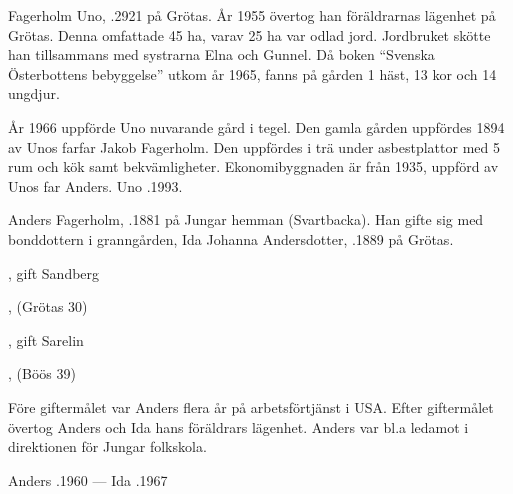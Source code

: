


Fagerholm Uno, .2921 på Grötas. År 1955 övertog han föräldrarnas lägenhet på Grötas. Denna omfattade 45 ha, varav 25 ha var odlad jord. Jordbruket skötte han tillsammans med systrarna Elna och Gunnel. Då boken ``Svenska Österbottens bebyggelse'' utkom år 1965, fanns på gården 1 häst, 13 kor och 14 ungdjur.

År 1966 uppförde Uno nuvarande gård i tegel. Den gamla gården uppfördes 1894 av Unos farfar Jakob Fagerholm. Den uppfördes i trä under asbestplattor med 5 rum och kök samt bekvämligheter. Ekonomibyggnaden är från 1935, uppförd av Unos far Anders.
Uno .1993.


Anders Fagerholm, .1881 på Jungar hemman (Svartbacka). Han gifte sig med bonddottern i granngården, Ida Johanna Andersdotter, .1889 på Grötas.
\begin{jhchildren}
  \item {}, gift Sandberg
  \item {}
  \item {}
  \item {}, (Grötas  30)
  \item {}
  \item {}, gift Sarelin
  \item {}, (Böös 39)
  \item {}
\end{jhchildren}

Före giftermålet var Anders flera år på arbetsförtjänst i USA. Efter giftermålet övertog Anders och Ida hans föräldrars lägenhet. Anders var bl.a ledamot i direktionen för Jungar folkskola.

Anders .1960  --- Ida .1967


